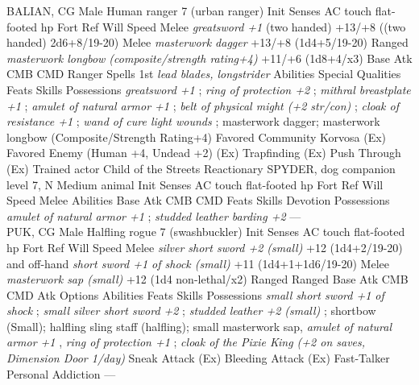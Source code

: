 BALIAN, CG Male Human ranger 7 (urban ranger)  Init Senses  AC touch flat-footed  hp  Fort Ref Will  Speed  Melee  {\itshape greatsword +1} (two handed) +13/+8 ((two handed) 2d6+8/19-20)  Melee  {\itshape masterwork dagger} +13/+8 (1d4+5/19-20)  Ranged  {\itshape masterwork longbow (composite/strength rating+4)} +11/+6 (1d8+4/x3)  Base Atk CMB CMD  Ranger Spells  1st  {\itshape lead blades, longstrider}   Abilities  Special Qualities  Feats  Skills  Possessions  {\itshape greatsword +1} ;  {\itshape ring of protection +2} ;  {\itshape mithral breastplate +1} ;  {\itshape amulet of natural armor +1} ;  {\itshape belt of physical might (+2 str/con)} ;  {\itshape cloak of resistance +1} ;  {\itshape wand of cure light wounds} ; masterwork dagger; masterwork longbow (Composite/Strength Rating+4)  Favored Community Korvosa (Ex)  Favored Enemy (Human +4, Undead +2) (Ex)  Trapfinding (Ex)  Push Through (Ex) Trained actor  Child of the Streets  Reactionary SPYDER, dog companion level 7, N Medium animal  Init Senses  AC touch flat-footed  hp  Fort Ref Will  Speed  Melee  Abilities  Base Atk CMB CMD  Feats  Skills  Devotion  Possessions  {\itshape amulet of natural armor +1} ;  {\itshape studded leather barding +2}  ---\\

PUK, CG Male Halfling rogue 7 (swashbuckler)  Init Senses  AC touch flat-footed  hp  Fort Ref Will  Speed  Melee  {\itshape silver short sword +2 (small)} +12 (1d4+2/19-20) and off-hand  {\itshape short sword +1 of shock (small)} +11 (1d4+1+1d6/19-20)  Melee  {\itshape masterwork sap (small)} +12 (1d4 non-lethal/x2)  Ranged  Ranged  Base Atk CMB CMD  Atk Options  Abilities  Feats  Skills  Possessions  {\itshape small short sword +1 of shock} ;  {\itshape small silver short sword +2} ;  {\itshape studded leather +2 (small)} ; shortbow (Small); halfling sling staff (halfling); small masterwork sap,  {\itshape amulet of natural armor +1} ,  {\itshape ring of protection +1} ;  {\itshape cloak of the Pixie King (+2 on saves, Dimension Door 1/day)}  Sneak Attack (Ex)  Bleeding Attack (Ex) Fast-Talker  Personal Addiction ---\\

